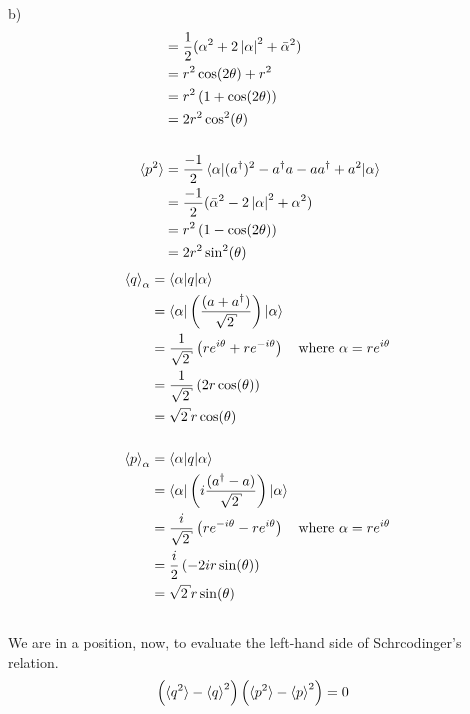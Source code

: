 \begin{homeworkProblem}[Problem 10]
\begin{homeworkSection}{b)}
\begin{align}
   &= \frac{1}{2}(\alpha^{2} + 2 \left| \alpha \right|^{2} + \bar{\alpha}^2 )\\
   &= r^{2} \cos(2\theta) + r^{2} \\
   &= r^{2} \left( 1 + \cos(2\theta) \right) \\
   &= 2 r^{2} \cos^{2}(\theta) \\ \nonumber \\
   \braket{p^2}
   &= \frac{-1}{2}
   \braket{\alpha |
   (a^\dagger)^{2} - a^{\dagger}a - aa^{\dagger} + a^{2} | \alpha } \\
   &= \frac{-1}{2}( \bar{\alpha}^2 - 2 \left| \alpha \right|^{2} + \alpha^{2}) \\
   &= r^{2} \left( 1 - \cos(2\theta) \right) \\
   &= 2 r^{2} \sin^{2}(\theta)
\end{align}
\begin{align} %
   \braket{q}_{\alpha} &= \braket{\alpha | q | \alpha} \\
                       &= \braket{\alpha |
   \left(\frac{(a+a^{\dagger})}{\sqrt{2}} \right)
| \alpha} \\
&= \frac{1}{\sqrt{2}} \left( r e^{i \theta} + r e^{- i \theta} \right)
\text{\quad where $\alpha = r e^{i \theta}$ } \\
&= \frac{1}{\sqrt{2}} \left( 2 r \cos(\theta) \right) \\
&= \sqrt{2} r  \cos(\theta) \\ \nonumber \\
\braket{p}_{\alpha} &= \braket{\alpha | q | \alpha} \\
                    &= \braket{\alpha |
\left(i\frac{(a^{\dagger}-a)}{\sqrt{2}} \right) | \alpha} \\
&= \frac{i}{\sqrt{2}} \left( r e^{-i \theta} - r e^{i \theta} \right)
\text{\quad where $\alpha = r e^{i \theta}$ } \\
&= \frac{i}{2} \left( - 2 i r \sin(\theta) \right) \\
&= \sqrt{2} r  \sin(\theta) \\ \nonumber \\
   \end{align}
   We are in a position, now, to evaluate the left-hand side of Schrcodinger's
   relation.
   \begin{align}
      \left( \braket{q^2} - \braket{q}^2 \right)
      \left( \braket{p^2} - \braket{p}^2 \right)  &=
      0

\end{align}
\end{homeworkSection}
\end{homeworkProblem}

